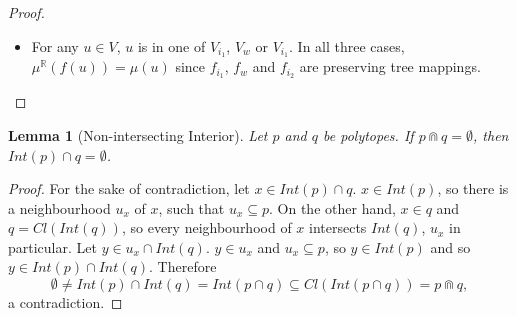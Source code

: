 \documentclass{article}
\newtheorem*{lemma}{Lemma}
\newcommand{\R}{\mathbb{R}}
\newcommand{\bcap}{\Cap}
\begin{document}
\begin{proof}
\begin{itemize}
\begin{itemize}
    Either way, $f(u_1) \bcap f(u_2) = \emptyset$, so the contact property also holds.

  \item Suppose $u_1$ is in $V_w$ and $u_2$ in $V_{i_1}$. Then $f(u_1) \subseteq (-\infty, 0]$ and $f(u_2) \subseteq [0, \mu(V_w)]$. Of course, $f(u_1) \bcap f(u_2) = \emptyset$. $f(u_1) \cap f(u_2) \neq \emptyset$ holds by the construction of the lemma exactly if $u_1 = i_1$ and $u_2 = w_1$, in  which case $\{u_1, u_2\} \in E$.

    A similar argument is made if $u_1$ and $u_2$ switch places above or if $u_1$ is in $V_{i_2}$ and $u_2$ is in $V_w$ or the other way around.
      \end{itemize}
    \item For any $u \in V$, $u$ is in one of $V_{i_1}$, $V_w$ or $V_{i_1}$. In all three cases, $\mu^\R(f(u)) = \mu(u)$ since $f_{i_1}$, $f_w$ and $f_{i_2}$ are preserving tree mappings.
    \end{itemize}
\end{proof}

\begin{lemma}[Non-intersecting Interior]
  Let $p$ and $q$ be polytopes. If $p \bcap q = \emptyset$, then $Int(p) \cap q = \emptyset$.
\end{lemma}
\begin{proof}
  For the sake of contradiction, let $x \in Int(p) \cap q$. $x \in Int(p)$, so there is a neighbourhood $u_x$ of $x$, such that $u_x \subseteq p$. On the other hand, $x \in q$ and $q = Cl(Int(q))$, so every neighbourhood of $x$ intersects $Int(q)$, $u_x$ in particular. Let $y \in u_x \cap Int(q)$. $y \in u_x$ and $u_x \subseteq p$, so $y \in Int(p)$ and so $y \in Int(p) \cap Int(q)$. Therefore \[\emptyset \neq Int(p) \cap Int(q) = Int(p \cap q) \subseteq Cl(Int(p \cap q)) = p \bcap q,\] a contradiction.
\end{proof}
\end{document}

